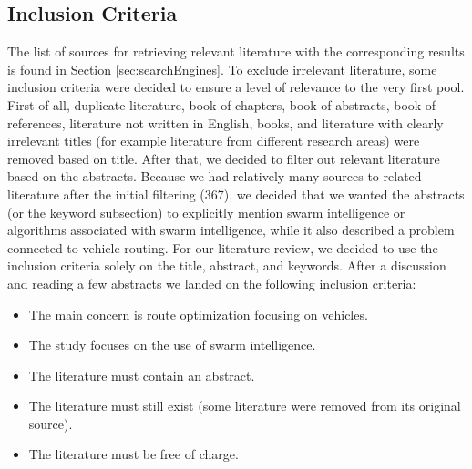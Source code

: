 



\subsection{Inclusion Criteria}
\label{sec:inclusionCriteria}
The list of sources for retrieving relevant literature with the corresponding results is found in Section \vref{sec:searchEngines}. To exclude irrelevant literature, some inclusion criteria were decided to ensure a level of relevance to the very first pool. First of all, duplicate literature, book of chapters, book of abstracts, book of references, literature not written in English, books, and literature with clearly irrelevant titles (for example literature from different research areas) were removed based on title. After that, we decided to filter out relevant literature based on the abstracts. Because we had relatively many sources to related literature after the initial filtering (367), we decided that we wanted the abstracts (or the keyword subsection) to explicitly mention swarm intelligence or algorithms associated with swarm intelligence, while it also described a problem connected to vehicle routing. For our literature review, we decided to use the inclusion criteria solely on the title, abstract, and keywords. After a discussion and reading a few abstracts we landed on the following inclusion criteria:
\begin{itemize}
\item The main concern is route optimization focusing on vehicles. 
\item The study focuses on the use of swarm intelligence.
\item The literature must contain an abstract. 
\item The literature must still exist (some literature were removed from its original source).
\item The literature must be free of charge.
\end{itemize}

